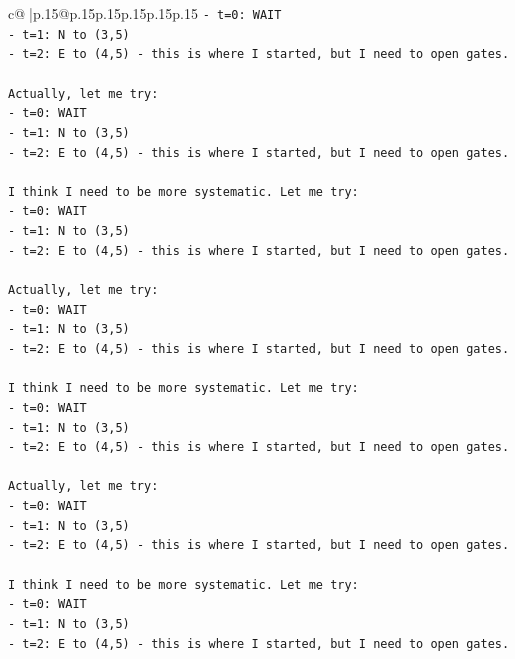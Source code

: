 \documentclass{article}
\begin{document}
{\begin{supertabular}{c@{$\;$}|p{.15\linewidth}@{}p{.15\linewidth}p{.15\linewidth}p{.15\linewidth}p{.15\linewidth}p{.15\linewidth}}
{{{\texttt{{-} t=0: WAIT} \\
\texttt{{-} t=1: N to (3,5)} \\
\texttt{{-} t=2: E to (4,5) {-} this is where I started, but I need to open gates.} \\
\\ 
\texttt{Actually, let me try:} \\
\texttt{{-} t=0: WAIT} \\
\texttt{{-} t=1: N to (3,5)} \\
\texttt{{-} t=2: E to (4,5) {-} this is where I started, but I need to open gates.} \\
\\ 
\texttt{I think I need to be more systematic. Let me try:} \\
\texttt{{-} t=0: WAIT} \\
\texttt{{-} t=1: N to (3,5)} \\
\texttt{{-} t=2: E to (4,5) {-} this is where I started, but I need to open gates.} \\
\\ 
\texttt{Actually, let me try:} \\
\texttt{{-} t=0: WAIT} \\
\texttt{{-} t=1: N to (3,5)} \\
\texttt{{-} t=2: E to (4,5) {-} this is where I started, but I need to open gates.} \\
\\ 
\texttt{I think I need to be more systematic. Let me try:} \\
\texttt{{-} t=0: WAIT} \\
\texttt{{-} t=1: N to (3,5)} \\
\texttt{{-} t=2: E to (4,5) {-} this is where I started, but I need to open gates.} \\
\\ 
\texttt{Actually, let me try:} \\
\texttt{{-} t=0: WAIT} \\
\texttt{{-} t=1: N to (3,5)} \\
\texttt{{-} t=2: E to (4,5) {-} this is where I started, but I need to open gates.} \\
\\ 
\texttt{I think I need to be more systematic. Let me try:} \\
\texttt{{-} t=0: WAIT} \\
\texttt{{-} t=1: N to (3,5)} \\
\texttt{{-} t=2: E to (4,5) {-} this is where I started, but I need to open gates.} \\
}}}
\end{supertabular}}
\end{document}
